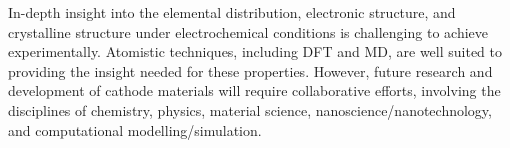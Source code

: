 \documentclass[../main.tex]{subfiles}
\begin{document}
In-depth insight into the elemental distribution, electronic structure, and crystalline structure under electrochemical conditions is challenging to achieve experimentally. Atomistic techniques, including DFT and MD, are well suited to providing the insight needed for these properties. However, future research and development of cathode materials will require collaborative efforts, involving the disciplines of chemistry, physics, material science, nanoscience/nanotechnology, and computational modelling/simulation.\cite{yu2018electrode}
\end{document}
